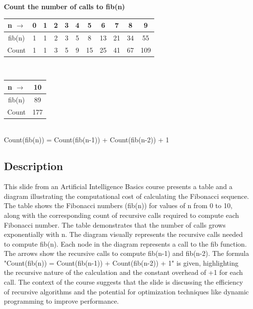 \documentclass{article}%
\begin{document}
\textbf{Count the number of calls to fib(n)} \\
\begin{tabular}{c|cccccccccc}
n $\rightarrow$ & 0 & 1 & 2 & 3 & 4 & 5 & 6 & 7 & 8 & 9 \\
\hline
fib(n) & 1 & 1 & 2 & 3 & 5 & 8 & 13 & 21 & 34 & 55 \\
Count & 1 & 1 & 3 & 5 & 9 & 15 & 25 & 41 & 67 & 109
\end{tabular}
\\
\begin{tabular}{c|c}
n $\rightarrow$ & 10 \\
\hline
fib(n) & 89 \\
Count & 177
\end{tabular}
\\
Count(fib(n)) = Count(fib(n-1)) + Count(fib(n-2)) + 1 \\
%
\subsection{Description}%
This slide from an Artificial Intelligence Basics course presents a table and a diagram illustrating the computational cost of calculating the Fibonacci sequence. The table shows the Fibonacci numbers (fib(n)) for values of n from 0 to 10, along with the corresponding count of recursive calls required to compute each Fibonacci number.  The table demonstrates that the number of calls grows exponentially with n. The diagram visually represents the recursive calls needed to compute fib(n).  Each node in the diagram represents a call to the fib function.  The arrows show the recursive calls to compute fib(n-1) and fib(n-2). The formula "Count(fib(n)) = Count(fib(n-1)) + Count(fib(n-2)) + 1" is given, highlighting the recursive nature of the calculation and the constant overhead of +1 for each call. The context of the course suggests that the slide is discussing the efficiency of recursive algorithms and the potential for optimization techniques like dynamic programming to improve performance.%
\end{document}
